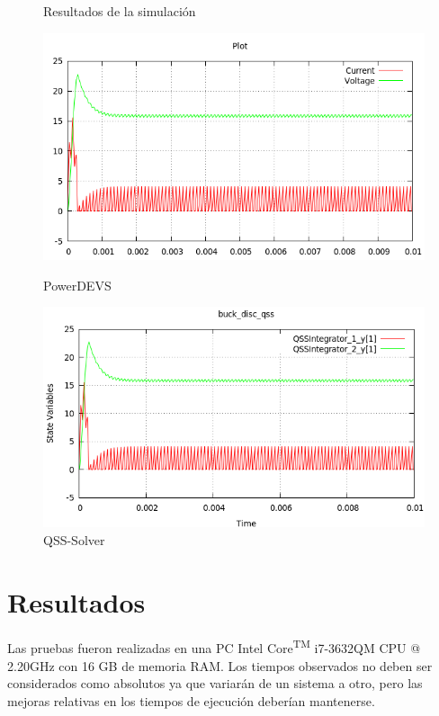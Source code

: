 \begin{figure}[H]
\centering
Resultados de la simulación \\
\begin{minipage}{0.5\textwidth}
 \includegraphics[width=\linewidth]{buck_disk-pd}
\caption{PowerDEVS}
\label{model:buckdisk_coupled0}
\end{minipage}\hfill
\begin{minipage}{0.5\textwidth}
 \includegraphics[width=\linewidth]{buck_disk-qss}
\caption{QSS-Solver}
\label{model:buckdisk_coupled0}
\end{minipage}
\end{figure}

\section{Resultados}

	Las pruebas fueron realizadas en una PC Intel\textsuperscript{\textregistered} Core\textsuperscript{TM} i7-3632QM CPU @ 2.20GHz con 16 GB de memoria RAM. Los tiempos observados no deben ser considerados 
	como absolutos ya que variarán de un sistema a otro, pero las mejoras relativas en los tiempos de ejecución deberían mantenerse.

